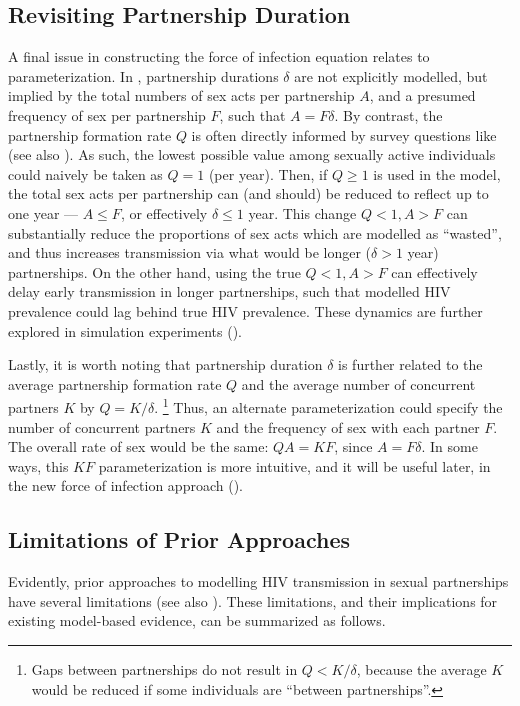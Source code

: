 \subsection{Revisiting Partnership Duration}\label{foi.prior.dur}
A final issue in constructing the force of infection equation relates to parameterization.
In , partnership durations $\delta$ are not explicitly modelled,
but implied by the total numbers of sex acts per partnership $A$,
and a presumed frequency of sex per partnership $F$, such that $A = F\delta$.
By contrast, the partnership formation rate $Q$ is often directly informed by survey questions like
(see also ).
As such, the lowest possible value among sexually active individuals
could naively be taken as $Q = 1$ (per year).
Then, if $Q \ge 1$ is used in the model,
the total sex acts per partnership can (and should) be reduced to reflect up to one year
--- \ie $A \le F$, or effectively $\delta \le 1$ year.
This change \vs $Q < 1, A > F$
can substantially reduce the proportions of sex acts which are modelled as ``wasted'',
and thus increases transmission via what would be longer ($\delta > 1$ year) partnerships.
On the other hand, using the true $Q < 1, A > F$
can effectively delay early transmission in longer partnerships,
such that modelled HIV prevalence could lag behind true HIV prevalence.
These dynamics are further explored in simulation experiments ().
\par
Lastly, it is worth noting that partnership duration $\delta$ is further related to
the average partnership formation rate $Q$ and
the average number of concurrent partners $K$ by $Q = K/\delta$.%
\footnote{Gaps between partnerships do not result in $Q < K/\delta$,
  because the average $K$ would be reduced if some individuals are ``between partnerships''.}
Thus, an alternate parameterization could specify
the number of concurrent partners $K$ and the frequency of sex with each partner $F$.
The overall rate of sex would be the same: $QA = KF$, since $A = F\delta$.
In some ways, this $KF$ parameterization is more intuitive,
and it will be useful later, in the new force of infection approach ().
\subsection{Limitations of Prior Approaches}\label{foi.prior.lims}
Evidently, prior approaches to modelling HIV transmission in sexual partnerships
have several limitations (see also \cite{Rao2021}).
These limitations, and their implications for existing model-based evidence,
can be summarized as follows.
